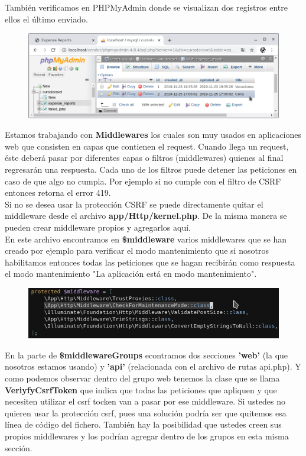 \documentclass{article}
\begin{document}
También verificamos en PHPMyAdmin donde se visualizan dos registros entre ellos
el último enviado.\\

\begin{figure}[h!]
  \centering
  \includegraphics[scale=0.5]{./Pictures/067_bd_ok.png}
\end{figure}

Estamos trabajando con \textbf{Middlewares} los cuales son muy usados en
aplicaciones web que consisten en capas que contienen el request. Cuando llega
un request, éste deberá pasar por diferentes capas o filtros (middlewares)
quienes al final regresarán una respuesta. Cada uno de los filtros puede
detener las peticiones en caso de que algo no cumpla. Por ejemplo si no cumple
con el filtro de CSRF entonces retorna el error 419.\\

Si no se desea usar la protección CSRF se puede directamente quitar el
middleware desde el archivo \textbf{app/Http/kernel.php}. De la misma manera se
pueden crear middleware propios y agregarlos aquí.\\

En este archivo encontramos en \textbf{\$middleware} varios middlewares que se
han creado por ejemplo para verificar el modo mantenimiento que si nosotros
habilitamos entonces todas las peticiones que se hagan recibirán como respuesta
el modo mantenimiento "La aplicación está en modo mantenimiento".

\begin{figure}[h!]
  \centering
  \includegraphics[scale=0.5]{./Pictures/069_middlewareMaintenanceMode.png}
\end{figure}

En la parte de \textbf{\$middlewareGroups} econtramos dos secciones
\textbf{'web'} (la que nosotros estamos usando) y \textbf{'api'} (relacionada
con el archivo de rutas api.php). Y como podemos observar dentro del grupo web
tenemos la clase que se llama \textbf{VeriyfyCsrfToken} que indica que todas
las peticiones que apliquen y que necesiten utilizar el csrf tocken van a pasar
por ese middleware. Si ustedes no quieren usar la protección csrf, pues una
solución podría ser que quitemos esa línea de código del fichero. También hay
la posibilidad que ustedes creen sus propios middlewares y los podrían agregar
dentro de los grupos en esta misma sección.\\
\end{document}
